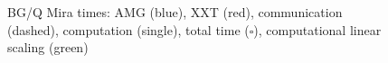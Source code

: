 \documentclass{sig-alternate}
\begin{document}
\begin{figure}
{  }
  \caption{BG/Q Mira times: AMG ({\color{blue}blue}), XXT ({\color{red}red}), communication (dashed),
  computation (single), total time ($\square$), computational linear scaling
  ({\color{green}green})}
  \label{fig:scaling_mira}
\end{figure}
\end{document}
